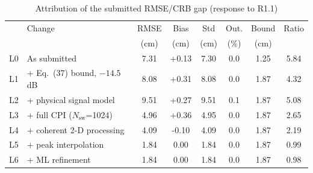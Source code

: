 \begin{table}[!t]
\centering
\caption{Attribution of the submitted RMSE/CRB gap (response to R1.1)}
\footnotesize
\setlength{\tabcolsep}{1.5pt}
\begin{tabular}{@{}clcccccc@{}}
\hline\hline
 & Change & RMSE & Bias & Std & Out. & Bound & Ratio \\
 &  & (cm) & (cm) & (cm) & (\%) & (cm) &  \\
\hline
L0 & As submitted & 7.31 & +0.13 & 7.30 & 0.0 & 1.25 & 5.84 \\
L1 & + Eq.~(37) bound, $-14.5$\,dB & 8.08 & +0.31 & 8.08 & 0.0 & 1.87 & 4.32 \\
L2 & + physical signal model & 9.51 & +0.27 & 9.51 & 0.1 & 1.87 & 5.08 \\
L3 & + full CPI ($N_{\mathrm{sw}}$=1024) & 4.96 & +0.36 & 4.95 & 0.0 & 1.87 & 2.65 \\
L4 & + coherent 2-D processing & 4.09 & -0.10 & 4.09 & 0.0 & 1.87 & 2.19 \\
L5 & + peak interpolation & 1.84 & 0.00 & 1.84 & 0.0 & 1.87 & 0.99 \\
L6 & + ML refinement & 1.84 & 0.00 & 1.84 & 0.0 & 1.87 & 0.98 \\
\hline\hline
\end{tabular}
\end{table}
